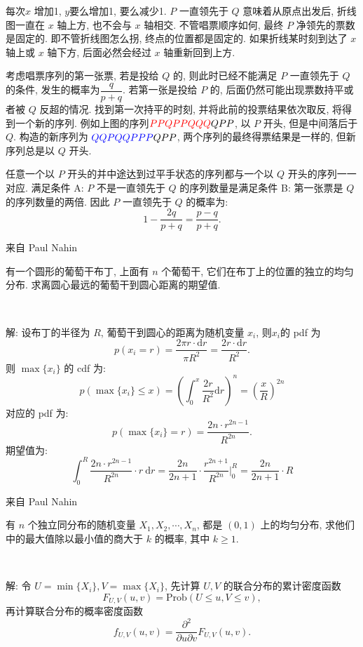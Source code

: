每次$x$ 增加1, $y$要么增加1, 要么减少1. $P$ 一直领先于 $Q$ 意味着从原点出发后, 折线图一直在 $x$ 轴上方, 也不会与 $x$ 轴相交. 不管唱票顺序如何, 最终 $P$ 净领先的票数是固定的. 即不管折线图怎么拐, 终点的位置都是固定的. 如果折线某时刻到达了 $x$ 轴上或 $x$ 轴下方, 后面必然会经过 $x$ 轴重新回到上方.

考虑唱票序列的第一张票, 若是投给 $Q$ 的, 则此时已经不能满足 $P$ 一直领先于 $Q$ 的条件, 发生的概率为$\dfrac{q}{p+q}$. 若第一张是投给 $P$ 的, 后面仍然可能出现票数持平或者被 $Q$ 反超的情况. 找到第一次持平的时刻, 并将此前的投票结果依次取反, 将得到一个新的序列. 例如上图的序列$\color{red}{PPQPPQQQ}\color{black}{QPP}$, 以 $P$ 开头, 但是中间落后于 $Q$. 构造的新序列为 $\color{blue}{QQPQQPPP}\color{black}{QPP}$, 两个序列的最终得票结果是一样的, 但新序列总是以 $Q$ 开头. 

任意一个以 $P$ 开头的并中途达到过平手状态的序列都与一个以 $Q$ 开头的序列一一对应. 满足条件 A: $P$ 不是一直领先于 $Q$ 的序列数量是满足条件 B: 第一张票是 $Q$ 的序列数量的两倍. 因此 $P$ 一直领先于 $Q$ 的概率为:
\[1 - \frac{2q}{p+q} = \frac{p-q}{p+q} .\]


\newpage 

\noindent 来自 Paul Nahin 

有一个圆形的葡萄干布丁, 上面有 $n$ 个葡萄干, 它们在布丁上的位置的独立的均匀分布. 求离圆心最远的葡萄干到圆心距离的期望值.

~

解: 设布丁的半径为 $R$, 葡萄干到圆心的距离为随机变量 $x_i$, 则$x_i$的 pdf 为
\[p(x_i=r) = \frac{2\pi r\cdot\mathrm{d}r}{\pi R^2} = \frac{2r\cdot\mathrm{d}r}{R^2}.\]
则 $\max\{x_i\}$ 的 cdf 为:
\[p(\max\{x_i\} \le x) = \left( \int_0^x{\frac{2r}{R^2} \mathrm{d}r}\right)^n = \left(\frac{x}{R}\right)^{2n}\]
对应的 pdf 为: 
\[p(\max\{x_i\} = r) = \frac{2n\cdot r^{2n-1}}{R^{2n}} .\]
期望值为:
\[\int_0^R{\frac{2n\cdot r^{2n-1}}{R^{2n}}\cdot r}\ \mathrm{d}r = \frac{2n}{2n+1}\cdot \frac{r^{2n+1}}{R^{2n}}\bigg|_0^R = \frac{2n}{2n+1}\cdot R\]



\newpage

\noindent 来自 Paul Nahin

有 $n$ 个独立同分布的随机变量 $X_1, X_2, \cdots, X_n$, 都是 $(0,1)$ 上的均匀分布, 求他们中的最大值除以最小值的商大于 $k$ 的概率, 其中 $k \ge 1$.

~

解: 令 $U = \min\{X_i\}, V = \max\{X_i\}$, 先计算 $U,V$ 的联合分布的累计密度函数 
$$F_{U,V}(u,v) = \mathrm{Prob}(U\le u, V\le v) ,$$ 
再计算联合分布的概率密度函数 
$$f_{U,V}(u,v) = \frac{\partial^2}{\partial u\partial v}F_{U,V}(u,v). $$


